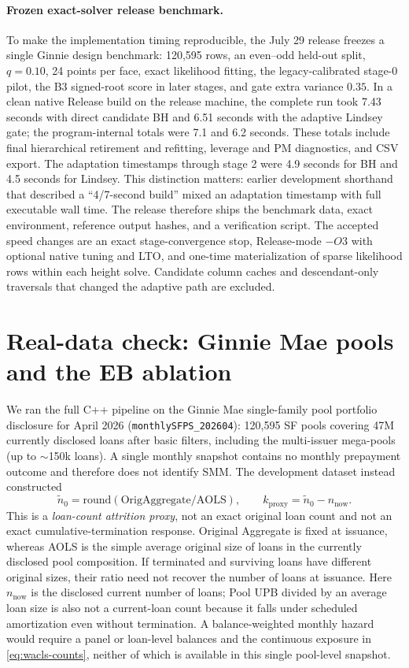 \documentclass[11pt]{article}
\begin{document}
\paragraph{Frozen exact-solver release benchmark.}
To make the implementation timing reproducible, the July 29 release freezes a
single Ginnie design benchmark: 120{,}595 rows, an even--odd held-out split,
$q=0.10$, 24 points per face, exact likelihood fitting, the legacy-calibrated
stage-0 pilot, the B3 signed-root score in later stages, and gate extra variance
$0.35$.  In a clean native Release build on the release machine, the complete
run took 7.43 seconds with direct candidate BH and 6.51 seconds with the
adaptive Lindsey gate; the program-internal totals were 7.1 and 6.2 seconds.
These totals include final hierarchical retirement and refitting, leverage and
PM diagnostics, and CSV export.  The adaptation timestamps through stage 2
were 4.9 seconds for BH and 4.5 seconds for Lindsey.  This distinction matters:
earlier development shorthand that described a ``4/7-second build'' mixed an
adaptation timestamp with full executable wall time.  The release therefore
ships the benchmark data, exact environment, reference output hashes, and a
verification script.  The accepted speed changes are an exact stage-convergence
stop, Release-mode $-O3$ with optional native tuning and LTO, and one-time
materialization of sparse likelihood rows within each height solve.  Candidate
column caches and descendant-only traversals that changed the adaptive path are
excluded.

\section{Real-data check: Ginnie Mae pools and the EB ablation}\label{sec:realdata}

We ran the full C++ pipeline on the Ginnie Mae single-family pool portfolio
disclosure for April 2026 (\texttt{monthlySFPS\_202604}): 120{,}595 SF pools
covering 47M currently disclosed loans after basic filters, including the
multi-issuer mega-pools (up to $\sim$150k loans). A single monthly snapshot
contains no monthly prepayment outcome and therefore does not identify SMM.
The development dataset instead constructed
\[
 \widetilde n_0=\mathrm{round}(\text{OrigAggregate}/\text{AOLS}),\qquad
 k_{\mathrm{proxy}}=\widetilde n_0-n_{\text{now}}.
\]
This is a \emph{loan-count attrition proxy}, not an exact original loan count
and not an exact cumulative-termination response. Original Aggregate is fixed
at issuance, whereas AOLS is the simple average original size of loans in the
currently disclosed pool composition. If terminated and surviving loans have
different original sizes, their ratio need not recover the number of loans at
issuance. Here $n_{\text{now}}$ is the disclosed current number of loans; Pool
UPB divided by an average loan size is also not a current-loan count because it
falls under scheduled amortization even without termination. A
balance-weighted monthly hazard would require a panel or loan-level balances
and the continuous exposure in \eqref{eq:wacls-counts}, neither of which is
available in this single pool-level snapshot.
\end{document}
